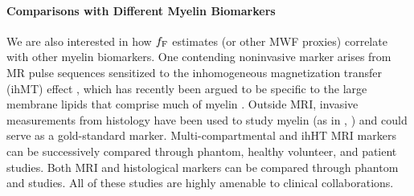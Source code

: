 \paragraph{Comparisons with Different Myelin Biomarkers}
We are also interested
in how $f_{\mathrm{F}}$ estimates (or other MWF proxies)
correlate with other myelin biomarkers. 
One contending noninvasive marker arises
from MR pulse sequences sensitized
to the inhomogeneous magnetization transfer (ihMT) effect
\cite{varma:15:mtf},
which has recently been argued
to be specific
to the large membrane lipids
that comprise much of myelin
\cite{varma:15:iom, swanson:16:mda}.
Outside MRI,
invasive measurements
from histology
have been used to study myelin 
(as in \eg, \cite{gareau:00:mta, webb:03:imt})
and could serve as a gold-standard \insitu marker.
Multi-compartmental and ihHT MRI markers 
can be successively compared 
through phantom, healthy volunteer, and patient studies.
Both MRI and histological markers
can be compared through 
phantom and \insitu studies.
All of these studies
are highly amenable 
to clinical collaborations.

